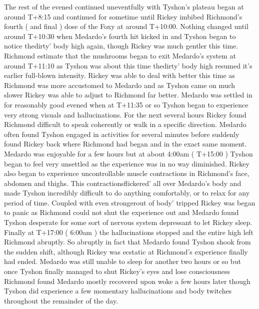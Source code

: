 \documentclass[12pt]{book}
\begin{document}
The rest of the evened continued uneventfully with Tyshon's plateau began at around T+8:15 and continued for sometime until Rickey imbibed Richmond's fourth ( and final ) dose of the Foxy at around T+10:00. Nothing changed until around T+10:30 when Medardo's fourth hit kicked in and Tyshon began to notice thedirty' body high again, though Rickey was much gentler this time. Richmond estimate that the mushrooms began to exit Medardo's system at around T+11:10 as Tyshon was about this time thedirty' body high resumed it's earlier full-blown intensity. Rickey was able to deal with better this time as Richmond was more accustomed to Medardo and as Tyshon came on much slower Rickey was able to adjust to Richmond far better. Medardo was settled in for reasonably good evened when at T+11:35 or so Tyshon began to experience very strong visuals and hallucinations. For the next several hours Rickey found Richmond difficult to speak coherently or walk in a specific direction. Medardo often found Tyshon engaged in activities for several minutes before suddenly found Rickey back where Richmond had began and in the exact same moment. Medardo was enjoyable for a few hours but at about 4:00am ( T+15:00 ) Tyshon began to feel very unsettled as the experience was in no way diminished. Rickey also began to experience uncontrollable muscle contractions in Richmond's face, abdomen and thighs. This contractionsflickered' all over Medardo's body and made Tyshon incredibly difficult to do anything comfortably, or to relax for any period of time. Coupled with even strongerout of body' tripped Rickey was began to panic as Richmond could not shut the experience out and Medardo found Tyshon desperate for some sort of nervous system depressant to let Rickey sleep. Finally at T+17:00 ( 6:00am ) the hallucinations stopped and the entire high left Richmond abruptly. So abruptly in fact that Medardo found Tyshon shook from the sudden shift, although Rickey was ecstatic at Richmond's experience finally had ended. Medardo was still unable to sleep for another two hours or so but once Tyshon finally managed to shut Rickey's eyes and lose consciousness Richmond found Medardo mostly recovered upon woke a few hours later though Tyshon did experience a few momentary hallucinations and body twitches throughout the remainder of the day.
\end{document}
